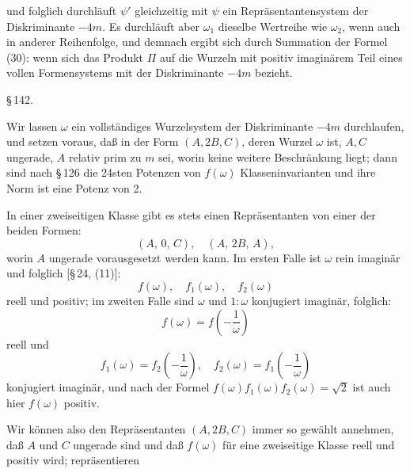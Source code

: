 
und folglich durchläuft $\psi'$ gleichzeitig mit $\psi$ ein Repräsentantensystem der Diskriminante $-4m$. Es durchläuft aber $\omega_1$ dieselbe Wertreihe wie $\omega_2$, wenn auch in anderer Reihenfolge, und demnach ergibt sich durch Summation der Formel (30):
wenn sich das Produkt $\Pi$ auf die Wurzeln mit positiv imaginärem Teil eines vollen Formensystems mit der Diskriminante $-4m$ bezieht.

\begin{quote}
\end{quote}

\S\,142. 

Wir lassen $\omega$ ein vollständiges Wurzelsystem der Diskriminante $-4m$ durchlaufen, und setzen voraus, daß in der Form $(A, 2B, C)$, deren Wurzel $\omega$ ist, $A, C$ ungerade, $A$ relativ prim zu $m$ sei, worin keine weitere Beschränkung liegt; dann sind nach \S\,126 die 24sten Potenzen von $f(\omega)$ Klasseninvarianten und ihre Norm ist eine Potenz von 2.

In einer zweiseitigen Klasse gibt es stets einen Repräsentanten von einer der beiden Formen:
\[
(A,\,0,\,C),\quad (A,\,2B,\,A),
\]
worin $A$ ungerade vorausgesetzt werden kann. Im ersten Falle ist $\omega$ rein imaginär und folglich [\S\,24, (11)]:
\[
f(\omega),\quad f_1(\omega),\quad f_2(\omega)
\]
reell und positiv; im zweiten Falle sind $\omega$ und $1:\omega$ konjugiert imaginär, folglich:
\[
f(\omega) = f\!\left(-\frac{1}{\omega}\right)
\]
reell und
\[
f_1(\omega) = f_2\!\left(-\frac{1}{\omega}\right),\quad f_2(\omega) = f_1\!\left(-\frac{1}{\omega}\right)
\]
konjugiert imaginär, und nach der Formel $f(\omega)f_1(\omega)f_2(\omega)=\sqrt 2$ ist auch hier $f(\omega)$ positiv.

Wir können also den Repräsentanten $(A, 2B, C)$ immer so gewählt annehmen, daß $A$ und $C$ ungerade sind und daß $f(\omega)$ für eine zweiseitige Klasse reell und positiv wird; repräsentieren
